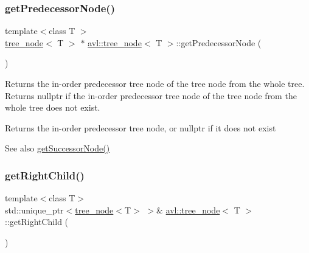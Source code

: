 \subsubsection{\texorpdfstring{get\+Predecessor\+Node()}{getPredecessorNode()}}
{\footnotesize\ttfamily template$<$class T $>$ \\
\hyperlink{classavl_1_1tree__node}{tree\+\_\+node}$<$ T $>$ $\ast$ \hyperlink{classavl_1_1tree__node}{avl\+::tree\+\_\+node}$<$ T $>$\+::get\+Predecessor\+Node (\begin{DoxyParamCaption}{ }\end{DoxyParamCaption})}

Returns the in-\/order predecessor tree node of the tree node from the whole tree. Returns nullptr if the in-\/order predecessor tree node of the tree node from the whole tree does not exist. \begin{DoxyReturn}{Returns}
the in-\/order predecessor tree node, or nullptr if it does not exist 
\end{DoxyReturn}
\begin{DoxySeeAlso}{See also}
\hyperlink{classavl_1_1tree__node_aa25a278d7fe3d4d83846bbf7fc256116}{get\+Successor\+Node()} 
\end{DoxySeeAlso}
\mbox{\label{classavl_1_1tree__node_ac79592e64351573e622d0977002fc813}} 
\subsubsection{\texorpdfstring{get\+Right\+Child()}{getRightChild()}}
{\footnotesize\ttfamily template$<$class T$>$ \\
std\+::unique\+\_\+ptr$<$\hyperlink{classavl_1_1tree__node}{tree\+\_\+node}$<$T$>$ $>$\& \hyperlink{classavl_1_1tree__node}{avl\+::tree\+\_\+node}$<$ T $>$\+::get\+Right\+Child (\begin{DoxyParamCaption}{ }\end{DoxyParamCaption})\hspace{0.3cm}{\ttfamily [inline]}}

